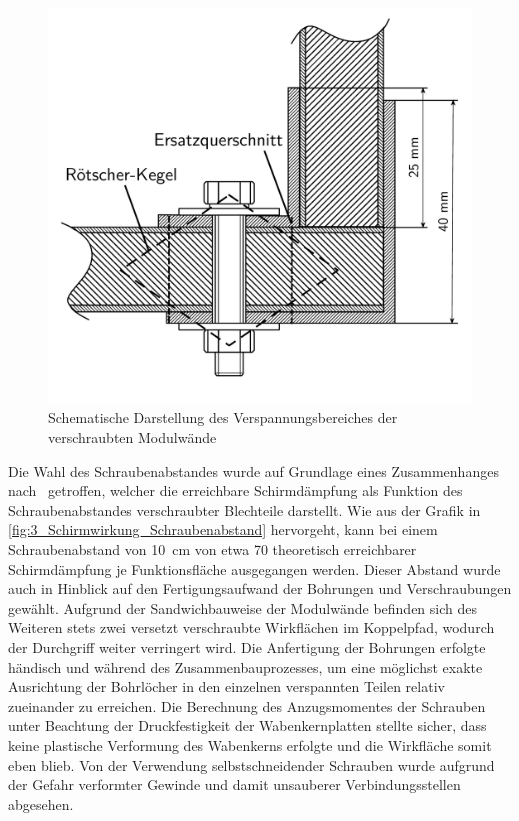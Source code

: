\begin{figure}[ht]
    \centering
    \includegraphics[page=1, trim=1cm 1.5cm 1cm 1cm, clip, width = .45\textwidth]{Abbildungen/Kapitel3/Schematik_Verspannungskegel.pdf}
    \caption{Schematische Darstellung des Verspannungsbereiches der verschraubten Modulwände}
    \label{fig:3_Verspannungskegel_L-Profile}
\end{figure}


Die Wahl des Schraubenabstandes wurde auf Grundlage eines Zusammenhanges nach~\cite{Design_of_shielded_enclosures} getroffen, welcher die erreichbare Schirmdämpfung als Funktion des Schraubenabstandes verschraubter Blechteile darstellt. Wie aus der Grafik in \Abb\ref{fig:3_Schirmwirkung_Schraubenabstand} hervorgeht, kann bei einem Schraubenabstand von \SI{10}{\centi\meter} von etwa \SI{70}{\Dezibel} theoretisch erreichbarer Schirmdämpfung je Funktionsfläche ausgegangen werden. Dieser Abstand wurde auch in Hinblick auf den Fertigungsaufwand der Bohrungen und Verschraubungen gewählt. Aufgrund der Sandwichbauweise der Modulwände befinden sich des Weiteren stets zwei versetzt verschraubte Wirkflächen im Koppelpfad, wodurch der Durchgriff weiter verringert wird. Die Anfertigung der Bohrungen erfolgte händisch und während des Zusammenbauprozesses, um eine möglichst exakte Ausrichtung der Bohrlöcher in den einzelnen verspannten Teilen relativ zueinander zu erreichen. Die Berechnung des Anzugsmomentes der Schrauben unter Beachtung der Druckfestigkeit der Wabenkernplatten stellte sicher, dass keine plastische Verformung des Wabenkerns erfolgte und die Wirkfläche somit eben blieb. Von der Verwendung selbstschneidender Schrauben wurde aufgrund der Gefahr verformter Gewinde und damit unsauberer Verbindungsstellen abgesehen.  
\par
\vspace{\linespace}\vspace{\linespace}

